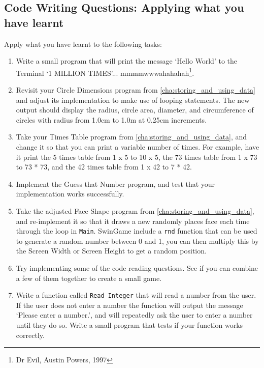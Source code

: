 \clearpage

\subsection{Code Writing Questions: Applying what you have learnt} %
\label{sub:code_writing_questions_applying_what_you_have_learnt_flow}

Apply what you have learnt to the following tasks:
\begin{enumerate}
  \item Write a small program that will print the message `Hello World' to the Terminal `1 MILLION TIMES'... mmmmwwwahahahah\footnote{Dr Evil, Austin Powers, 1997}.
  \item Revisit your Circle Dimensions program from \cref{cha:storing_and_using_data} and adjust its implementation to make use of looping statements. The new output should display the radius, circle area, diameter, and circumference of circles with radius from 1.0cm to 1.0m at 0.25cm increments.
  \item Take your Times Table program from \cref{cha:storing_and_using_data}, and change it so that you can print a variable number of times. For example, have it print the 5 times table from 1 x 5 to 10 x 5, the 73 times table from 1 x 73 to 73 * 73, and the 42 times table from 1 x 42 to 7 * 42.  
  \item Implement the Guess that Number program, and test that your implementation works successfully.
  \item Take the adjusted Face Shape program from \cref{cha:storing_and_using_data}, and re-implement it so that it draws a new randomly places face each time through the loop in \texttt{Main}. SwinGame include a \texttt{rnd} function that can be used to generate a random number between 0 and 1, you can then multiply this by the Screen Width or Screen Height to get a random position.
  \item Try implementing some of the code reading questions. See if you can combine a few of them together to create a small game.
  
  \item Write a function called \texttt{Read Integer} that will read a number from the user. If the user does not enter a number the function will output the message `Please enter a number.', and will repeatedly ask the user to enter a number until they do so. Write a small program that tests if your function works correctly.
  
  \begin{figure}[h]
  \end{figure}
  

\end{enumerate}
